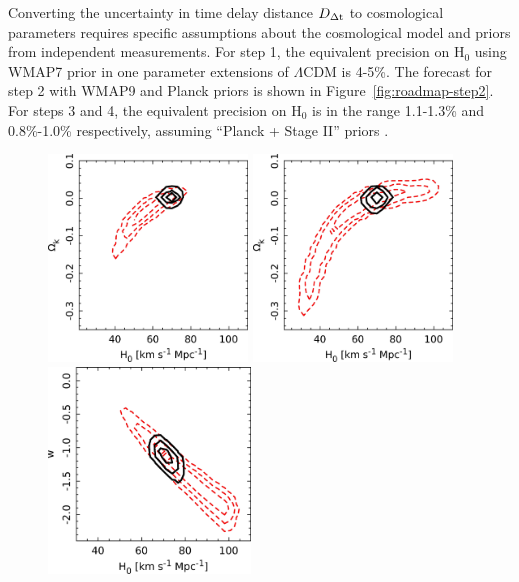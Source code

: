 Converting the uncertainty
in time delay distance $D_{\Delta{\rm t}}$ to cosmological parameters requires
specific assumptions about the cosmological model and priors from
independent measurements. For step 1, the equivalent precision on H$_0$
using WMAP7 prior in one parameter extensions of $\Lambda$CDM is 4-5\%.
The forecast for step 2 with WMAP9 and Planck priors is shown in
Figure~\ref{fig:roadmap-step2}. For steps 3 and 4, the equivalent
precision on H$_0$ is in the range 1.1-1.3\% and 0.8\%-1.0\%
respectively, assuming ``Planck + Stage II'' priors \citep{C+M09b}.


\begin{figure}
\begin{center}
\includegraphics[height=5.5cm,clip]{figures/planck_olcdm_c22lenses_stats.jpg}
\includegraphics[height=5.5cm,clip]{figures/wmap9_olcdm_c22lenses_stats.jpg}
\includegraphics[height=5.5cm,clip]{figures/planck_wcdm_c22lenses_stats.jpg}

\end{center}
\end{figure}
